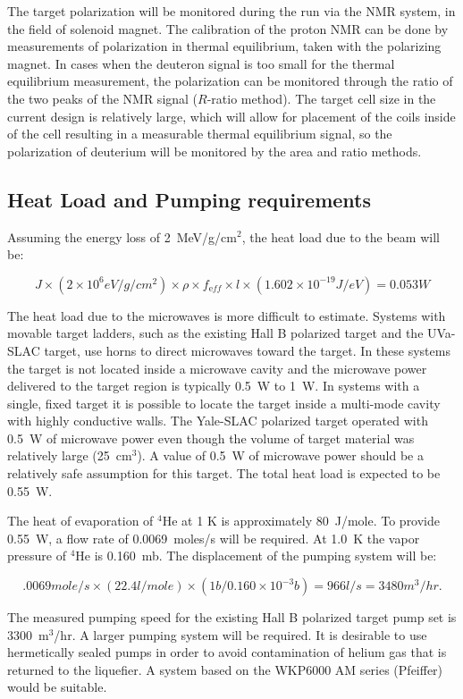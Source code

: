 The target polarization will be monitored during the run via the NMR system, 
in the field of solenoid magnet. The calibration of the proton NMR can be 
done by measurements of polarization in thermal equilibrium, taken with the 
polarizing magnet. In cases when the deuteron signal is too small for the 
thermal equilibrium measurement, the polarization can be monitored through 
the ratio of the two peaks of the NMR signal ($R$-ratio method).  The target 
cell size in the current design is relatively large, which will allow for 
placement of the coils inside of the cell resulting in a measurable thermal 
equilibrium signal, so the polarization of deuterium will be monitored by 
the area and ratio methods.

\subsection{Heat Load and Pumping requirements}

Assuming the energy loss of 2~MeV/g/cm$^2$, the heat load due to the beam 
will be:

\begin{equation}
J \times (2\times10^6 eV/g/cm^2)\times \rho \times f_{\mathrm eff}\times l 
\times (1.602\times 10^{-19}J/eV) = 0.053 W
\end{equation}

The heat load due to the microwaves is more difficult to estimate. Systems 
with movable target ladders, such as the existing Hall B polarized target 
and the UVa-SLAC target, use horns to direct microwaves toward the target. 
In these systems the target is not located inside a microwave cavity and 
the microwave power delivered to the target region is typically 0.5~W to 1~W. 
In systems with a single, fixed target it is possible to locate the target 
inside a multi-mode cavity with highly conductive walls.  The Yale-SLAC 
polarized target operated with 0.5~W of microwave power even though the 
volume of target material was relatively large (25~cm$^3$).  A value of 0.5~W 
of microwave power should be a relatively safe assumption for this target.
The total heat load is expected to be 0.55~W.

The heat of evaporation of $^4$He at 1 K is approximately 80~J/mole.  To 
provide 0.55~W, a flow rate of 0.0069~moles/s will be required.  At 1.0~K 
the vapor pressure of $^4$He is 0.160~mb.  The displacement of the pumping 
system will be:

\begin{equation}
.0069 mole/s \times (22.4 l/mole)\times (1 b/0.160 \times 10^{-3} b) 
= 966 l/s = 3480 m^3/hr.
\end{equation}

The measured pumping speed for the existing Hall B polarized target pump set 
is 3300~m$^3$/hr.  A larger pumping system will be required.  It is desirable 
to use hermetically sealed pumps in order to avoid contamination of helium 
gas that is returned to the liquefier. A system based on the WKP6000 AM 
series (Pfeiffer) would be suitable.

